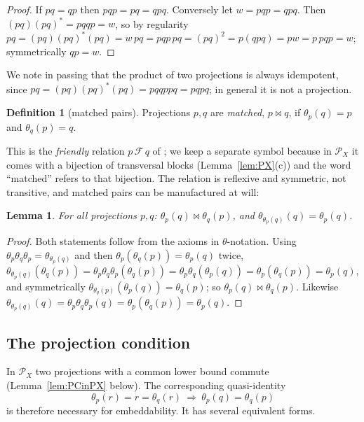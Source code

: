\documentclass[11pt]{amsart}
\newtheorem{lemma}[theorem]{Lemma}
\theoremstyle{definition}
\newtheorem{definition}[theorem]{Definition}
\renewcommand{\P}{\mathcal{P}}      %
\newcommand{\mt}{\bowtie}      %
\begin{document}
\begin{proof}
If $pq=qp$ then $pqp=pq=qpq$. Conversely let $w=pqp=qpq$. Then $(pq)(pq)^*=pqqp=w$, so by regularity $pq=(pq)(pq)^*(pq)=w\,pq=pqp\,pq=(pq)^2=p(qpq)=pw=p\,pqp=w$; symmetrically $qp=w$.
\end{proof}

We note in passing that the product of two projections is always idempotent, since $pq=(pq)(pq)^*(pq)=pqqppq=pqpq$; in general it is not a projection.

\begin{definition}[matched pairs]\label{def:matched}
Projections $p,q$ are \emph{matched}, $p\mt q$, if $\theta_p(q)=p$ and $\theta_q(p)=q$.
\end{definition}

This is the \emph{friendly} relation $p\,\mathcal F\,q$ of \cite{EGMR}; we keep a separate symbol because in $\P_X$ it comes with a bijection of transversal blocks (Lemma~\ref{lem:PX}(c)) and the word ``matched'' refers to that bijection. The relation is reflexive and symmetric, not transitive, and matched pairs can be manufactured at will:

\begin{lemma}\label{lem:friends}
For all projections $p,q$: $\theta_p(q)\mt\theta_q(p)$, and $\theta_{\theta_p(q)}(q)=\theta_p(q)$.
\end{lemma}

\begin{proof}
Both statements follow from the axioms in $\theta$-notation. Using $\theta_p\theta_q\theta_p=\theta_{\theta_p(q)}$ and then $\theta_p(\theta_q(p))=\theta_p(q)$ twice,
\[
\theta_{\theta_p(q)}(\theta_q(p))=\theta_p\theta_q\theta_p(\theta_q(p))=\theta_p\theta_q(\theta_p(q))=\theta_p(\theta_q(p))=\theta_p(q),
\]
and symmetrically $\theta_{\theta_q(p)}(\theta_p(q))=\theta_q(p)$; so $\theta_p(q)\mt\theta_q(p)$. Likewise $\theta_{\theta_p(q)}(q)=\theta_p\theta_q\theta_p(q)=\theta_p(\theta_q(p))=\theta_p(q)$.
\end{proof}

\subsection{The projection condition}\label{subsec:Q1}

In $\P_X$ two projections with a common lower bound commute (Lemma~\ref{lem:PCinPX} below). The corresponding quasi-identity
\begin{equation}\label{eq:Q1}\tag{PC}
\theta_p(r)=r=\theta_q(r)\ \Longrightarrow\ \theta_p(q)=\theta_q(p)
\end{equation}
is therefore necessary for embeddability. It has several equivalent forms.
\end{document}
